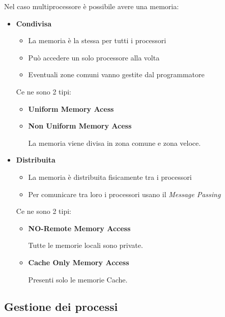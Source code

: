 \documentclass{article}
\begin{document}
Nel caso multiprocessore è possibile avere una memoria:
\begin{itemize}
    \item \textbf{Condivisa}
        \begin{itemize}
            \item La memoria è la stessa per tutti i processori
            \item Può accedere un solo processore alla volta
            \item Eventuali zone comuni vanno gestite dal programmatore
        \end{itemize}

        Ce ne sono 2 tipi:
        \begin{itemize}
            \item \textbf{Uniform Memory Acess}

            \item \textbf{Non Uniform Memory Acess}

                La memoria viene divisa in zona comune e zona veloce.
                
        \end{itemize}
    
    \item \textbf{Distribuita}
        \begin{itemize}
            \item La memoria è distribuita fisicamente tra i processori
            \item Per comunicare tra loro i processori usano il \textit{Message Passing}
        \end{itemize}

        Ce ne sono 2 tipi:
        \begin{itemize}
            \item  \textbf{NO-Remote Memory Access}

                Tutte le memorie locali sono private.

            \item \textbf{Cache Only Memory Access}

                Presenti solo le memorie Cache.
                
        \end{itemize}
    
\end{itemize}

\subsection{Gestione dei processi}
\end{document}
